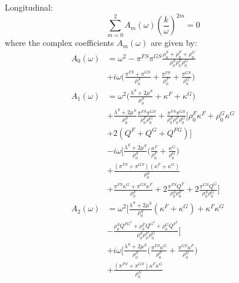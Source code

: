 \documentclass[twocolumn]{article}
\begin{document}
Longitudinal:
\begin{equation*}
    \sum_{m = 0}^{2} A_m(\omega)\left(\frac{k}{\omega}\right)^{2m} = 0
\end{equation*}
where the complex coefficients $A_m(\omega)$ are given by:
\begin{align*}
    A_0(\omega) & = \omega^2 - \pi^{FS}\pi^{GS}\frac{\rho_0^S + \rho_0^F + \rho_0^G}{\rho_0^S\rho_0^F\rho_0^G} \\
                & + i\omega\bigl(\frac{\pi^{FS} + \pi^{GS}}{\rho_0^S} + \frac{\pi^{FS}}{\rho_0^F}
    + \frac{\pi^{GS}}{\rho_0^G}\bigr)                                                                          \\
    A_1(\omega) & = \omega^2\bigl(\frac{\lambda^S + 2\mu^S}{\rho_0^S} + \kappa^F + \kappa^G\bigr)              \\
                & + \frac{\lambda^S + 2\mu^S}{\rho_0^S}\frac{\pi^{FS}\pi^{GS}}{\rho_0^F\rho_0^G}
    +\frac{\pi^{FS}\pi^{GS}}{\rho_0^S\rho_0^F\rho_0^G}
    [\rho_0^F\kappa^F + \rho_0^G\kappa^G                                                                       \\
                & + 2(Q^F + Q^G + Q^{FG})]                                                                     \\
                & -i\omega\bigl[\frac{\lambda^S + 2\mu^S}{\rho_0^S}
    \bigl(\frac{\kappa^F}{\rho_0^F}+\frac{\kappa^G}{\rho_0^G}\bigr)                                            \\
                & + \frac{(\pi^{FS}+\pi^{GS})(\kappa^F + \kappa^G)}{\rho_0^S}                                  \\
                & +\frac{\pi^{FS}\kappa^G + \pi^{GS}\kappa^F}{\rho_0^F}
    + 2\frac{\pi^{FS}Q^F}{\rho_0^S\rho_0^F} + 2\frac{\pi^{GS}Q^G}{\rho_0^S\rho_0^G}\bigr]                      \\
    A_2(\omega) & = \omega^2\bigl[\frac{\lambda^S + 2\mu^S}{\rho_0^S}(\kappa^F + \kappa^G)
    + \kappa^F\kappa^G                                                                                         \\
                & -\frac{\rho_0^SQ^{FG^2} + \rho_0^FQ^{G^2} + \rho_0^GQ^{F^2}}{\rho_0^S\rho_0^F\rho_0^G}\bigr] \\
                & +i\omega\bigl[\frac{\lambda^S + 2\mu^S}{\rho_0^S}
    \bigl(\frac{\pi^{FS}\kappa^G}{\rho_0^F} + \frac{\pi^{GS}\kappa^F}{\rho_0^G}\bigr)                          \\
                & +\frac{(\pi^{FS}+\pi^{GS})\kappa^F\kappa^G}{\rho_0^S}                                        \\

\end{align*}
\end{document}
